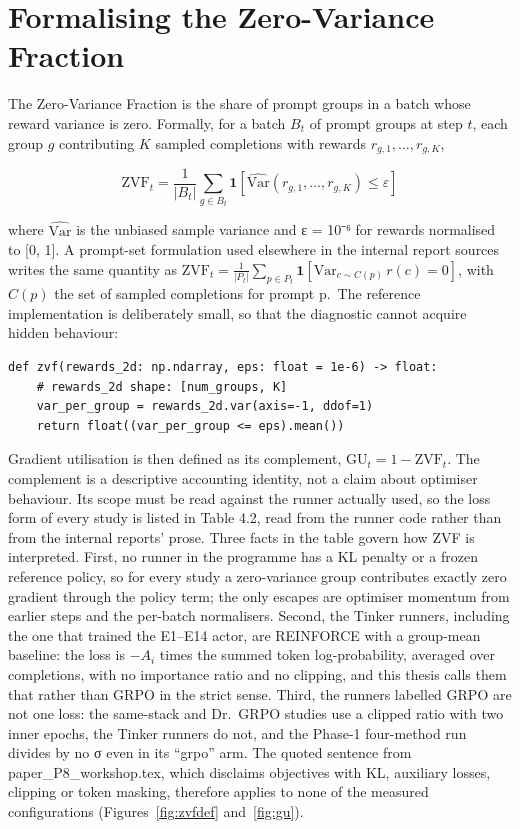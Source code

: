 \documentclass[12pt,a4paper]{report}
\begin{document}
\section{Formalising the Zero-Variance
Fraction}\label{formalising-the-zero-variance-fraction}

The Zero-Variance Fraction is the share of prompt groups in a batch
whose reward variance is zero. Formally, for a batch \(B_t\) of prompt
groups at step \(t\), each group \(g\) contributing \(K\) sampled
completions with rewards \(r_{g,1}, \ldots, r_{g,K}\),

\[\mathrm{ZVF}_t = \frac{1}{|B_t|} \sum_{g \in B_t} \mathbf{1}\!\left[\widehat{\mathrm{Var}}(r_{g,1}, \ldots, r_{g,K}) \le \varepsilon\right]\]

where \(\widehat{\mathrm{Var}}\) is the unbiased sample variance and ε =
10⁻⁶ for rewards normalised to {[}0, 1{]}. A prompt-set formulation used
elsewhere in the internal report sources writes the same quantity as
\(\mathrm{ZVF}_t = \frac{1}{|P_t|} \sum_{p \in P_t} \mathbf{1}[\mathrm{Var}_{c \sim C(p)}\, r(c) = 0]\),
with \(C(p)\) the set of sampled completions for prompt p.~The reference
implementation is deliberately small, so that the diagnostic cannot
acquire hidden behaviour:

\begin{verbatim}
def zvf(rewards_2d: np.ndarray, eps: float = 1e-6) -> float:
    # rewards_2d shape: [num_groups, K]
    var_per_group = rewards_2d.var(axis=-1, ddof=1)
    return float((var_per_group <= eps).mean())
\end{verbatim}

Gradient utilisation is then defined as its complement,
\(\mathrm{GU}_t = 1 - \mathrm{ZVF}_t\). The complement is a descriptive
accounting identity, not a claim about optimiser behaviour. Its scope
must be read against the runner actually used, so the loss form of every
study is listed in Table 4.2, read from the runner code rather than from
the internal reports' prose. Three facts in the table govern how ZVF is
interpreted. First, no runner in the programme has a KL penalty or a
frozen reference policy, so for every study a zero-variance group
contributes exactly zero gradient through the policy term; the only
escapes are optimiser momentum from earlier steps and the per-batch
normalisers. Second, the Tinker runners, including the one that trained
the E1--E14 actor, are REINFORCE with a group-mean baseline: the loss is
\(-A_i\) times the summed token log-probability, averaged over
completions, with no importance ratio and no clipping, and this thesis
calls them that rather than GRPO in the strict sense. Third, the runners
labelled GRPO are not one loss: the same-stack and Dr.~GRPO studies use
a clipped ratio with two inner epochs, the Tinker runners do not, and
the Phase-1 four-method run divides by no σ even in its ``grpo'' arm.
The quoted sentence from paper\_\allowbreak{}P8\_\allowbreak{}workshop.tex, which disclaims
objectives with KL, auxiliary losses, clipping or token masking,
therefore applies to none of the measured configurations (Figures~\ref{fig:zvfdef} and~\ref{fig:gu}).
\end{document}
